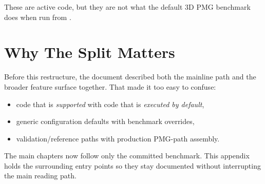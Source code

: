 These are active code, but they are not what the default 3D PMG benchmark does
when run from .

\section{Why The Split Matters}

Before this restructure, the document described both the mainline path and the
broader feature surface together. That made it too easy to confuse:
\begin{itemize}
\item code that is \emph{supported} with code that is \emph{executed by
default},
\item generic configuration defaults with benchmark overrides,
\item validation/reference paths with production PMG-path assembly.
\end{itemize}

The main chapters now follow only the committed benchmark. This appendix holds
the surrounding entry points so they stay documented without interrupting the
main reading path.
